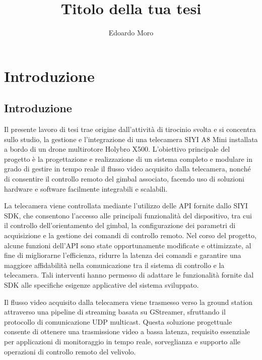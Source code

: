 
\usepackage[italian]{babel}
\usepackage[T1]{fontenc}
\usepackage[utf8]{inputenc}
\usepackage{graphicx}
\usepackage{geometry}
\geometry{margin=3cm}

\title{Titolo della tua tesi}
\author{Edoardo Moro}



\maketitle
\tableofcontents
\clearpage


\chapter{Introduzione}
\label{cap:introduzione}

\newpage

\section{Introduzione}
\label{cap:introduzione}

Il presente lavoro di tesi trae origine dall’attività di tirocinio svolta e si concentra sullo studio, la gestione e l’integrazione di una telecamera SIYI A8 Mini installata a bordo di un drone multirotore Holybro X500. L’obiettivo principale del progetto è la progettazione e realizzazione di un sistema completo e modulare in grado di gestire in tempo reale il flusso video acquisito dalla telecamera, nonché di consentire il controllo remoto del gimbal associato, facendo uso di soluzioni hardware e software facilmente integrabili e scalabili.\bigskip

La telecamera viene controllata mediante l’utilizzo delle API fornite dallo SIYI SDK\cite{siyi_sdk}, che consentono l’accesso alle principali funzionalità del dispositivo, tra cui il controllo dell’orientamento del gimbal, la configurazione dei parametri di acquisizione e la gestione dei comandi di controllo remoto. Nel corso del progetto, alcune funzioni dell’API sono state opportunamente modificate e ottimizzate, al fine di migliorarne l’efficienza, ridurre la latenza dei comandi e garantire una maggiore affidabilità nella comunicazione tra il sistema di controllo e la telecamera. Tali interventi hanno permesso di adattare le funzionalità fornite dal SDK alle specifiche esigenze applicative del sistema sviluppato.\bigskip

Il flusso video acquisito dalla telecamera viene trasmesso verso la ground station attraverso una pipeline di streaming basata su GStreamer\cite{gstreamer}, sfruttando il protocollo di comunicazione UDP multicast. Questa soluzione progettuale consente di ottenere una trasmissione video a bassa latenza, requisito essenziale per applicazioni di monitoraggio in tempo reale, sorveglianza e supporto alle operazioni di controllo remoto del velivolo.\bigskip

